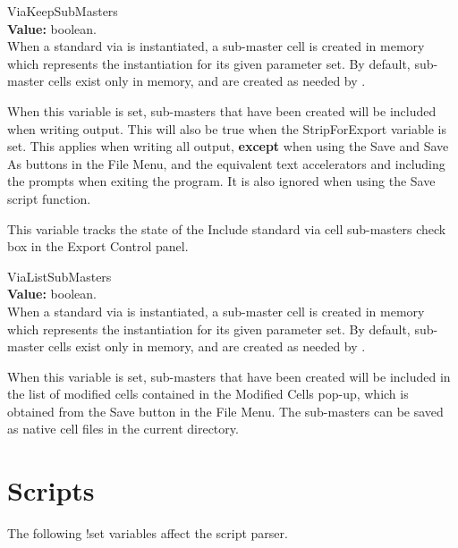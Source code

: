 \begin{description}
\item{\et ViaKeepSubMasters}\\
{\bf Value:} boolean.\\
When a standard via is instantiated, a sub-master cell is created in
memory which represents the instantiation for its given parameter set. 
By default, sub-master cells exist only in memory, and are created as
needed by {\Xic}.

When this variable is set, sub-masters that have been created will be
included when writing output.  This will also be true when the {\cb
StripForExport} variable is set.  This applies when writing all
output, {\bf except} when using the {\cb Save} and {\cb Save As}
buttons in the {\cb File Menu}, and the equivalent text accelerators
and including the prompts when exiting the program.  It is also
ignored when using the {\vt Save} script function.

This variable tracks the state of the {\cb Include standard via cell
sub-masters} check box in the {\cb Export Control} panel.

\item{\et ViaListSubMasters}\\
{\bf Value:} boolean.\\
When a standard via is instantiated, a sub-master cell is created in
memory which represents the instantiation for its given parameter set. 
By default, sub-master cells exist only in memory, and are created as
needed by {\Xic}.

When this variable is set, sub-masters that have been created will be
included in the list of modified cells contained in the {\cb Modified
Cells} pop-up, which is obtained from the {\cb Save} button in the
{\cb File Menu}.  The sub-masters can be saved as native cell files in
the current directory.
\end{description}


\section{Scripts}

The following {\cb !set} variables affect the script parser.

